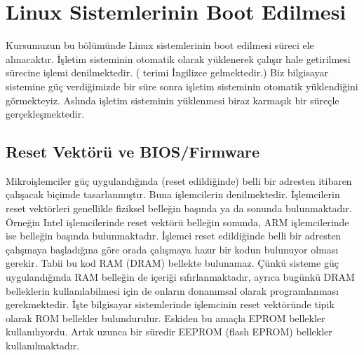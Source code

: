 \documentclass[a4paper,10pt,turkish]{sphinxmanual}
\begin{document}
\section{Linux Sistemlerinin Boot Edilmesi}
\label{\detokenize{introduction:linux-sistemlerinin-boot-edilmesi}}
\sphinxAtStartPar
Kursumuzun bu bölümünde Linux sistemlerinin boot edilmesi süreci ele alınacaktır. İşletim sisteminin otomatik olarak
yüklenerek çalışır hale getirilmesi sürecine  işlemi denilmektedir. ( terimi İngilizce  gelmektedir.) Biz bilgisayar sistemine güç verdiğimizde bir süre sonra işletim sisteminin otomatik
yüklendiğini görmekteyiz. Aslında işletim sisteminin yüklenmesi biraz karmaşık bir süreçle gerçekleşmektedir.


\subsection{Reset Vektörü ve BIOS/Firmware}
\label{\detokenize{introduction:reset-vektoru-ve-bios-firmware}}
\sphinxAtStartPar
Mikroişlemciler güç uygulandığında (reset edildiğinde) belli bir adresten itibaren çalışacak biçimde tasarlanmıştır.
Buna işlemcilerin  denilmektedir. İşlemcilerin reset vektörleri genellikle fiziksel belleğin başında
ya da sonunda bulunmaktadır. Örneğin Intel işlemcilerinde reset vektörü belleğin sonunda, ARM işlemcilerinde ise
belleğin başında bulunmaktadır. İşlemci reset edildiğinde belli bir adresten çalışmaya başladığına göre orada
çalışmaya hazır bir kodun bulunuyor olması gerekir. Tabii bu kod RAM (DRAM) bellekte bulunamaz. Çünkü sisteme güç
uygulandığında RAM belleğin de içeriği sıfırlanmaktadır, ayrıca bugünkü DRAM belleklerin kullanılabilmesi için de
onların donanımsal olarak programlanması gerekmektedir. İşte bilgisayar sistemlerinde işlemcinin reset vektöründe
tipik olarak ROM bellekler bulundurulur. Eskiden bu amaçla EPROM bellekler kullanılıyordu. Artık uzunca bir süredir
EEPROM (flash EPROM) bellekler kullanılmaktadır.
\end{document}
